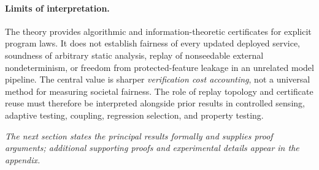 \paragraph{Limits of interpretation.}
The theory provides algorithmic and information-theoretic certificates for explicit program laws. It does not establish fairness of every updated deployed service, soundness of arbitrary static analysis, replay of nonseedable external nondeterminism, or freedom from protected-feature leakage in an unrelated model pipeline. The central value is sharper \emph{verification cost accounting}, not a universal method for measuring societal fairness. The role of replay topology and certificate reuse must therefore be interpreted alongside prior results in controlled sensing, adaptive testing, coupling, regression selection, and property testing.

\noindent\textit{The next section states the principal results formally and supplies proof arguments; additional supporting proofs and experimental details appear in the appendix.}\par
\medskip


